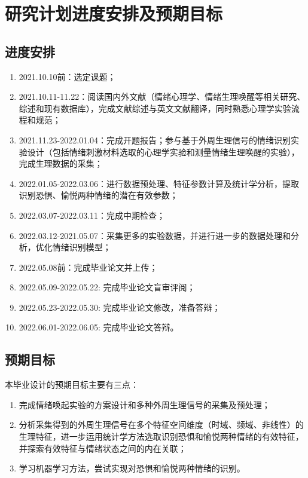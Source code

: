 \section{研究计划进度安排及预期目标}

\subsection{进度安排}
\begin{enumerate}
    \item 2021.10.10前：选定课题；
    \item 2021.10.11-11.22：阅读国内外文献（情绪心理学、情绪生理唤醒等相关研究、综述和现有数据库），完成文献综述与英文文献翻译，同时熟悉心理学实验流程和规范；
    \item 2021.11.23-2022.01.04：完成开题报告；参与基于外周生理信号的情绪识别实验设计（包括情绪刺激材料选取的心理学实验和测量情绪生理唤醒的实验），完成生理数据的采集；
    \item 2022.01.05-2022.03.06：进行数据预处理、特征参数计算及统计学分析，提取识别恐惧、愉悦两种情绪的潜在有效参数；
    \item 2022.03.07-2022.03.11：完成中期检查；
    \item 2022.03.12-2021.05.07：采集更多的实验数据，并进行进一步的数据处理和分析，优化情绪识别模型；
    \item 2022.05.08前：完成毕业论文并上传；
    \item 2022.05.09-2022.05.22: 完成毕业论文盲审评阅；
    \item 2022.05.23-2022.05.30: 完成毕业论文修改，准备答辩；
    \item 2022.06.01-2022.06.05: 完成毕业论文答辩。
\end{enumerate}

\subsection{预期目标}
本毕业设计的预期目标主要有三点：
\begin{enumerate}
    \item 完成情绪唤起实验的方案设计和多种外周生理信号的采集及预处理；
    \item 分析采集得到的外周生理信号在多个特征空间维度（时域、频域、非线性）的生理特征，进一步运用统计学方法选取识别恐惧和愉悦两种情绪的有效特征，并探索有效特征与情绪状态之间的内在关联；
    \item 学习机器学习方法，尝试实现对恐惧和愉悦两种情绪的识别。
\end{enumerate}
